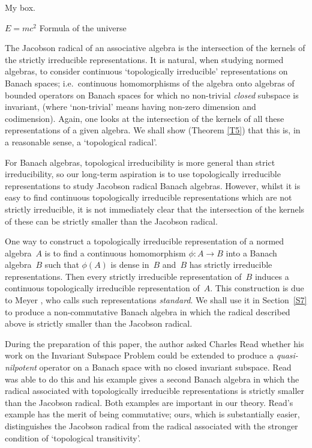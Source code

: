 \documentclass[11pt]{article}
\newcommand{\ie}{i.e.\ }
\begin{document}
\begin{tcolorbox}[colback=green!5!white,colframe=green!75!black]
  My box.


$E = mc^2$  Formula of the universe


\end{tcolorbox}







The Jacobson radical of an associative algebra is the intersection of the
kernels of the strictly irreducible representations.  It is natural, when
studying normed algebras, to consider continuous `topologically irreducible'
representations on Banach spaces; \ie continuous homomorphisms of the algebra
onto algebras of bounded operators on Banach spaces for which no
non-trivial {\em closed} subspace is invariant, (where `non-trivial' means
having non-zero dimension and codimension).  Again, one looks at the
intersection of the kernels of all these representations of a given algebra.  We
shall show (Theorem \ref{T5}) that this is, in a reasonable sense, a
`topological radical'.

For Banach algebras, topological irreducibility is more general than strict
irreducibility, so our long-term aspiration is to use topologically irreducible
representations to study Jacobson radical Banach algebras.   However, whilst it
is easy to find continuous topologically irreducible representations which are
not strictly irreducible, it is not immediately clear that the intersection of
the kernels of these can be strictly smaller than the Jacobson radical.

One way to construct a topologically irreducible representation of a normed
algebra~$A$ is to find a continuous homomorphism $\phi:A\to B$ into a Banach
algebra~$B$ such that $\phi(A)$ is dense in~$B$ and~$B$ has strictly irreducible
representations.    Then every strictly irreducible representation of~$B$
induces a continuous topologically irreducible representation of~$A$.  This
construction is due to Meyer \cite{Meyer1}, who calls such representations {\em
standard}.     We shall use it in Section~\ref{S7} to produce a non-commutative
Banach algebra in which the radical described above is strictly smaller than the
Jacobson radical.

During the preparation of this paper, the author asked Charles Read whether his
work on the Invariant Subspace Problem could be extended to produce a {\it
quasi-nilpotent} operator on a Banach space with no closed invariant subspace.
Read was able to do this \cite{Readqn} and his example gives a second Banach
algebra in which the radical associated with topologically irreducible
representations is strictly smaller than the Jacobson radical.  Both examples
are important in our theory.   Read's example has the merit of being commutative;
ours, which is substantially easier, distinguishes the Jacobson radical from the
radical associated with the stronger condition of `topological transitivity'.
\end{document}
